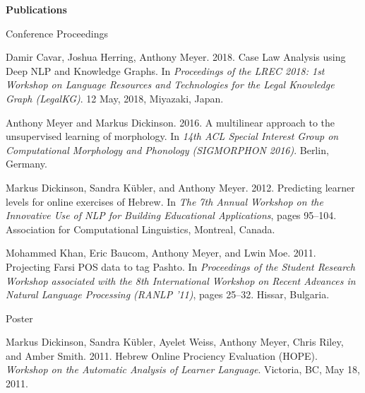 \begin{singlespace}

%
\vspace{20pt}
\centerline{ \textbf{Publications}}
\vspace{10pt} 
\centerline{Conference Proceedings}
\begin{description}
\item Damir Cavar, Joshua Herring, Anthony Meyer. 2018. Case Law Analysis using Deep NLP and Knowledge Graphs. 
In \emph{Proceedings of the LREC 2018: 1st Workshop on Language Resources and Technologies for the Legal Knowledge Graph (LegalKG)}. 12 May, 2018, Miyazaki, Japan.
\item Anthony Meyer and Markus Dickinson. 2016. A multilinear approach to the unsupervised
learning of morphology. In \emph{14th ACL Special Interest Group on Computational Morphology and
Phonology (SIGMORPHON 2016)}. Berlin, Germany.
\item Markus Dickinson, Sandra K\"{u}bler, and Anthony Meyer. 2012. Predicting learner levels for online
exercises of Hebrew. In \emph{The 7th Annual Workshop on the Innovative Use of NLP for Building
Educational Applications}, pages 95--104. Association for Computational Linguistics, Montreal,
Canada.
\item Mohammed Khan, Eric Baucom, Anthony Meyer, and Lwin Moe. 2011. Projecting Farsi POS
data to tag Pashto. In \emph{Proceedings of the Student Research Workshop associated with the 8th
International Workshop on Recent Advances in Natural Language Processing (RANLP '11)},
pages 25--32. Hissar, Bulgaria.
\end{description}
\vspace{-3pt}
\centerline{Poster} %
\begin{description}
\item Markus Dickinson, Sandra K\"{u}bler, Ayelet Weiss, Anthony Meyer, Chris Riley, and Amber Smith.
2011. Hebrew Online Prociency Evaluation (HOPE). \emph{Workshop on the Automatic Analysis of
Learner Language}. Victoria, BC, May 18, 2011.
\end{description}

\end{singlespace}
